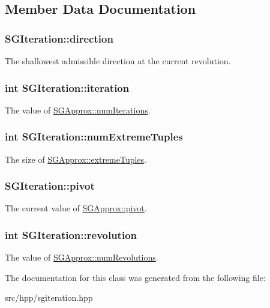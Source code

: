 \subsection{Member Data Documentation}
\hypertarget{classSGIteration_ac35e7e3049cd60c695a366cb8f75db37}{
\subsubsection[{direction}]{ S\-G\-Iteration\-::direction}}\label{classSGIteration_ac35e7e3049cd60c695a366cb8f75db37}
The shallowest admissible direction at the current revolution. \hypertarget{classSGIteration_a44a4f9e3cb074181292ae816b2c28d9e}{
\subsubsection[{iteration}]{\setlength{\rightskip}{0pt plus 5cm}int S\-G\-Iteration\-::iteration}}\label{classSGIteration_a44a4f9e3cb074181292ae816b2c28d9e}
The value of \hyperlink{classSGApprox_a7ab53424f5933726a15001ff2885a4a9}{S\-G\-Approx\-::num\-Iterations}. \hypertarget{classSGIteration_a14ecfb94b3111911d9b0ef545f72e88d}{
\subsubsection[{num\-Extreme\-Tuples}]{\setlength{\rightskip}{0pt plus 5cm}int S\-G\-Iteration\-::num\-Extreme\-Tuples}}\label{classSGIteration_a14ecfb94b3111911d9b0ef545f72e88d}
The size of \hyperlink{classSGApprox_ab0e2c4678401f806922ac64667ad5ff6}{S\-G\-Approx\-::extreme\-Tuples}. \hypertarget{classSGIteration_abdae7d336968af3515e7d9590cbcc46d}{
\subsubsection[{pivot}]{ S\-G\-Iteration\-::pivot}}\label{classSGIteration_abdae7d336968af3515e7d9590cbcc46d}
The current value of \hyperlink{classSGApprox_a037c73ff2b6ff8a55fadf57bb0a6a546}{S\-G\-Approx\-::pivot}. \hypertarget{classSGIteration_a21cc5c4fc7c40ff444ac7e3743c13940}{
\subsubsection[{revolution}]{\setlength{\rightskip}{0pt plus 5cm}int S\-G\-Iteration\-::revolution}}\label{classSGIteration_a21cc5c4fc7c40ff444ac7e3743c13940}
The value of \hyperlink{classSGApprox_a2bd0cab80a3f8d799fdc2841b65dd2c2}{S\-G\-Approx\-::num\-Revolutions}. 

The documentation for this class was generated from the following file\-:\begin{DoxyCompactItemize}
\item 
src/hpp/sgiteration.\-hpp\end{DoxyCompactItemize}
